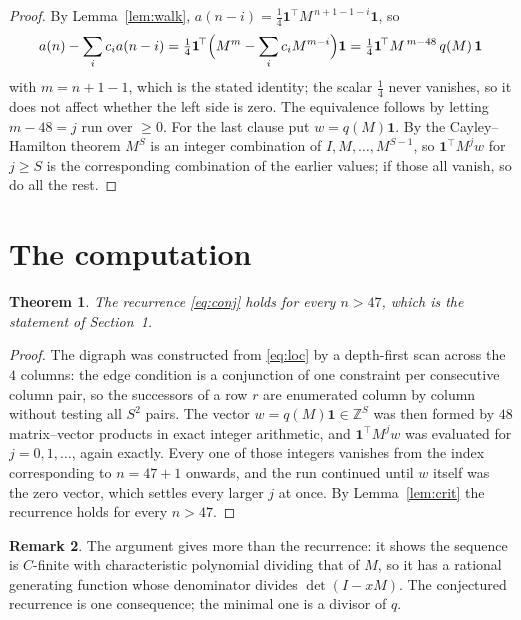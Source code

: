 \documentclass[11pt,a4paper]{article}
\theoremstyle{plain}
\newtheorem{theorem}{Theorem}
\theoremstyle{definition}
\newtheorem{remark}[theorem]{Remark}
\begin{document}
\begin{proof}
By Lemma~\ref{lem:walk}, $a(n-i)=\tfrac1{4}\mathbf{1}^{\!\top}M^{\,n+1-1-i}\mathbf{1}$, so
\[
a(n)-\sum_i c_i a(n-i)
=\tfrac1{4}\mathbf{1}^{\!\top}\Bigl(M^{m}-\sum_i c_i M^{m-i}\Bigr)\mathbf{1}
=\tfrac1{4}\mathbf{1}^{\!\top}M^{\,m-48}\,q(M)\,\mathbf{1}
\]
with $m=n+1-1$, which is the stated identity; the scalar $\tfrac1{4}$ never vanishes, so
it does not affect whether the left side is zero. The equivalence follows by letting
$m-48=j$ run over $\ge0$. For the last clause put $w=q(M)\mathbf{1}$. By the
Cayley--Hamilton theorem $M^{S}$ is an integer combination of $I,M,\dots,M^{S-1}$, so
$\mathbf{1}^{\!\top}M^{j}w$ for $j\ge S$ is the corresponding combination of the earlier
values; if those all vanish, so do all the rest.
\end{proof}

\section{The computation}

\begin{theorem}
The recurrence \eqref{eq:conj} holds for every $n>47$, which is the statement of
Section~1.
\end{theorem}

\begin{proof}
The digraph was constructed from \eqref{eq:loc} by a depth-first scan across the $4$
columns: the edge condition is a conjunction of one constraint per consecutive column
pair, so the successors of a row $r$ are enumerated column by column without testing all
$S^2$ pairs. The vector $w=q(M)\mathbf{1}\in\mathbb{Z}^{S}$ was then formed by $48$
matrix--vector products in exact integer arithmetic, and $\mathbf{1}^{\!\top}M^{j}w$ was
evaluated for $j=0,1,\dots$, again exactly. Every one of those integers vanishes from the
index corresponding to $n=47+1$ onwards, and the run continued until $w$ itself was the
zero vector, which settles every larger $j$ at once. By Lemma~\ref{lem:crit} the recurrence
holds for every $n>47$.
\end{proof}

\begin{remark}
The argument gives more than the recurrence: it shows the sequence is $C$-finite with
characteristic polynomial dividing that of $M$, so it has a rational generating function
whose denominator divides $\det(I-xM)$. The conjectured recurrence is one consequence; the
minimal one is a divisor of $q$.
\end{remark}
\end{document}
